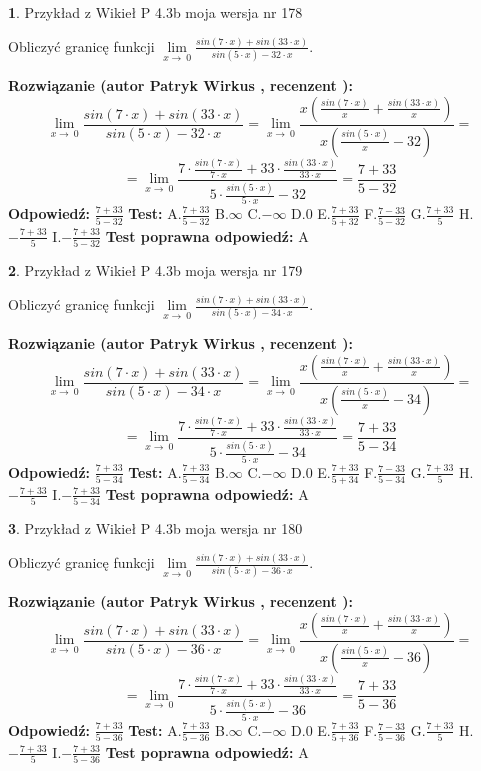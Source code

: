 \documentclass[12pt, a4paper]{article}
\theoremstyle{definition} %
\newtheorem{zad}{}
\newcommand{\zadStart}[1]{\begin{zad}#1\newline}
\newcommand{\zadStop}{\end{zad}}
\newcommand{\rozwStart}[2]{\noindent \textbf{Rozwiązanie (autor #1 , recenzent #2): }\newline}
\newcommand{\rozwStop}{\newline}
\newcommand{\odpStart}{\noindent \textbf{Odpowiedź:}\newline}
\newcommand{\odpStop}{\newline}
\newcommand{\testStart}{\noindent \textbf{Test:}\newline}
\newcommand{\testStop}{\newline}
\newcommand{\kluczStart}{\noindent \textbf{Test poprawna odpowiedź:}\newline}
\newcommand{\kluczStop}{\newline}
\begin{document}
\zadStart{Przykład z Wikieł P 4.3b moja wersja nr 178}


Obliczyć granicę funkcji $\lim\limits_{x\to\ 0}\frac{sin(7 \cdot x)+sin(33 \cdot x)}{sin(5 \cdot x)-32 \cdot x}$.
\zadStop
\rozwStart{Patryk Wirkus}{}
$$\lim\limits_{x\to\ 0}\frac{sin(7 \cdot x)+sin(33 \cdot x)}{sin(5 \cdot x)-32 \cdot x}=\lim\limits_{x\to\ 0}\frac{x(\frac{sin(7 \cdot x)}{x}+\frac{sin(33 \cdot x)}{x})}{x(\frac{sin(5 \cdot x)}{x}-32)}=$$
$$=\lim\limits_{x\to\ 0}\frac{7 \cdot \frac{sin(7 \cdot x)}{7 \cdot x}+33 \cdot \frac{sin(33 \cdot x)}{33 \cdot x}}{5 \cdot \frac{sin(5 \cdot x)}{5 \cdot x}-32}=\frac{7+33}{5-32}$$
\rozwStop
\odpStart
$\frac{7+33}{5-32}$
\odpStop
\testStart
A.$\frac{7+33}{5-32}$
B.$\infty$
C.$-\infty$
D.$0$
E.$\frac{7+33}{5+32}$
F.$\frac{7-33}{5-32}$
G.$\frac{7+33}{5}$
H.$-\frac{7+33}{5}$
I.$-\frac{7+33}{5-32}$
\testStop
\kluczStart
A
\kluczStop



\zadStart{Przykład z Wikieł P 4.3b moja wersja nr 179}


Obliczyć granicę funkcji $\lim\limits_{x\to\ 0}\frac{sin(7 \cdot x)+sin(33 \cdot x)}{sin(5 \cdot x)-34 \cdot x}$.
\zadStop
\rozwStart{Patryk Wirkus}{}
$$\lim\limits_{x\to\ 0}\frac{sin(7 \cdot x)+sin(33 \cdot x)}{sin(5 \cdot x)-34 \cdot x}=\lim\limits_{x\to\ 0}\frac{x(\frac{sin(7 \cdot x)}{x}+\frac{sin(33 \cdot x)}{x})}{x(\frac{sin(5 \cdot x)}{x}-34)}=$$
$$=\lim\limits_{x\to\ 0}\frac{7 \cdot \frac{sin(7 \cdot x)}{7 \cdot x}+33 \cdot \frac{sin(33 \cdot x)}{33 \cdot x}}{5 \cdot \frac{sin(5 \cdot x)}{5 \cdot x}-34}=\frac{7+33}{5-34}$$
\rozwStop
\odpStart
$\frac{7+33}{5-34}$
\odpStop
\testStart
A.$\frac{7+33}{5-34}$
B.$\infty$
C.$-\infty$
D.$0$
E.$\frac{7+33}{5+34}$
F.$\frac{7-33}{5-34}$
G.$\frac{7+33}{5}$
H.$-\frac{7+33}{5}$
I.$-\frac{7+33}{5-34}$
\testStop
\kluczStart
A
\kluczStop



\zadStart{Przykład z Wikieł P 4.3b moja wersja nr 180}


Obliczyć granicę funkcji $\lim\limits_{x\to\ 0}\frac{sin(7 \cdot x)+sin(33 \cdot x)}{sin(5 \cdot x)-36 \cdot x}$.
\zadStop
\rozwStart{Patryk Wirkus}{}
$$\lim\limits_{x\to\ 0}\frac{sin(7 \cdot x)+sin(33 \cdot x)}{sin(5 \cdot x)-36 \cdot x}=\lim\limits_{x\to\ 0}\frac{x(\frac{sin(7 \cdot x)}{x}+\frac{sin(33 \cdot x)}{x})}{x(\frac{sin(5 \cdot x)}{x}-36)}=$$
$$=\lim\limits_{x\to\ 0}\frac{7 \cdot \frac{sin(7 \cdot x)}{7 \cdot x}+33 \cdot \frac{sin(33 \cdot x)}{33 \cdot x}}{5 \cdot \frac{sin(5 \cdot x)}{5 \cdot x}-36}=\frac{7+33}{5-36}$$
\rozwStop
\odpStart
$\frac{7+33}{5-36}$
\odpStop
\testStart
A.$\frac{7+33}{5-36}$
B.$\infty$
C.$-\infty$
D.$0$
E.$\frac{7+33}{5+36}$
F.$\frac{7-33}{5-36}$
G.$\frac{7+33}{5}$
H.$-\frac{7+33}{5}$
I.$-\frac{7+33}{5-36}$
\testStop
\kluczStart
A
\kluczStop
\end{document}
